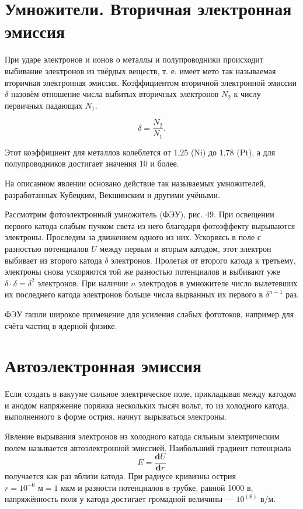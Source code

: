\documentclass[a4paper,10pt]{book}
\begin{document}
\section{Умножители. Вторичная электронная эмиссия}

При ударе электронов и ионов о металлы и полупроводники происходит выбивание электронов из твёрдых веществ, т. е. имеет мето так называемая вторичная электронная эмиссия. Коэффициентом вторичной электронной эмиссии $\delta$ назовём отношение числа выбитых вторичных электронов $N_2$ к числу первичных падающих $N_1$.

\begin{equation}
\delta = \frac{N_2}{N_1}.
\end{equation}

Этот коэффициент для металлов колеблется от 1,25 (Ni) до 1,78 (Pt), а для полупроводников достигает значения 10 и более.

На описанном явлении основано действие так называемых умножителей, разработанных Кубецким, Векшинским и другими учёными.

Рассмотрим фотоэлектронный умножитель (ФЭУ), рис. 49. При освещении первого катода слабым пучком света из него благодаря фотоэффекту вырываются электроны. Проследим за движением одного из них. Ускоряясь в поле с разностью потенциалов $U$ между первым и вторым катодом, этот электрон выбивает из второго катода $\delta$ электронов. Пролетая от второго катода к третьему, электроны снова ускоряются той же разностью потенциалов и выбивают уже $\delta\cdot\delta=\delta^{2}$ электронов. При наличии $n$ электродов в умножителе число вылетевших их последнего катода электронов больше числа вырванных их первого в $\delta^{n-1}$ раз.

ФЭУ гашли широкое применение для усиления слабых фототоков, например для счёта частиц в ядерной физике.

\section{Автоэлектронная эмиссия}

Если создать в вакууме сильное электрическое поле, прикладывая между катодом и анодом напряжение поряжка нескольких тысяч вольт, то из холодного катода, выполненного в форме острия, начнут вырываться электроны.

Явление вырывания электронов из холодного катода сильным электрическим полем называется автоэлектронной эмиссией. Наибольший градиент потенциала\begin{equation}
E = \frac{\mathbf{d}U}{\mathbf{d}r}
\end{equation} получается как раз вблизи катода. При радиусе кривизны острия $r=10^{-6} \textit{ м} = 1 \textit{ мкм} $ и разности потенциалов в трубке, равной 1000 $\textit{в}$, напряжённость поля у катода достигает громадной величины — $10^(8)\textit{ в/м} $.
\end{document}
